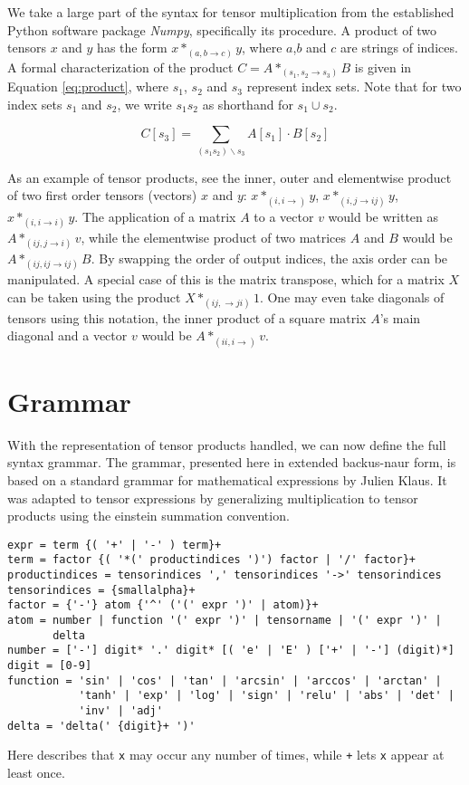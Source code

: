 \documentclass[12pt, a4paper]{report}
\begin{document}
We take a large part of the syntax for tensor multiplication from the established Python software package \textit{Numpy}, specifically its  procedure. %
A product of two tensors $x$ and $y$ has the form $x*_{(a,b \rightarrow c)}y$, where $a$,$b$ and $c$ are strings of indices.
A formal characterization of the product $C = A *_{(s_1,s_2 \rightarrow s_3)} B$ is given in Equation \ref{eq:product}, where $s_1$, $s_2$ and $s_3$ represent index sets.
Note that for two index sets $s_1$ and $s_2$, we write $s_1 s_2$ as shorthand for $s_1 \cup s_2$.

\begin{equation}
    C[s_3] = \sum_{(s_1 s_2)  \backslash s_3} A[s_1] \cdot B[s_2]
    \label{eq:product}
\end{equation}

As an example of tensor products, see the inner, outer and elementwise product of two first order tensors (vectors) $x$ and $y$: $x*_{(i,i \rightarrow)}y$, $x*_{(i,j \rightarrow ij)}y$, $x*_{(i,i \rightarrow i)}y$.
The application of a matrix $A$ to a vector $v$ would be written as $A*_{(ij,j \rightarrow i)}v$, while the elementwise product of two matrices $A$ and $B$ would be $A*_{(ij,ij \rightarrow ij)}B$.
By swapping the order of output indices, the axis order can be manipulated.
A special case of this is the matrix transpose, which for a matrix $X$ can be taken using the product $X *_{(ij, \rightarrow ji)} 1$.
One may even take diagonals of tensors using this notation, the inner product of a square matrix $A$'s main diagonal and a vector $v$ would be $A*_{(ii,i \rightarrow)}v$.


\section{Grammar}
With the representation of tensor products handled, we can now define the full syntax grammar.
The grammar, presented here in extended backus-naur form, is based on a standard grammar for mathematical expressions by Julien Klaus. %
It was adapted to tensor expressions by generalizing multiplication to tensor products using the einstein summation convention.
\begin{verbatim}
expr = term {( '+' | '-' ) term}+
term = factor {( '*(' productindices ')') factor | '/' factor}+
productindices = tensorindices ',' tensorindices '->' tensorindices
tensorindices = {smallalpha}+
factor = {'-'} atom {'^' ('(' expr ')' | atom)}+
atom = number | function '(' expr ')' | tensorname | '(' expr ')' | 
       delta
number = ['-'] digit* '.' digit* [( 'e' | 'E' ) ['+' | '-'] (digit)*]
digit = [0-9]
function = 'sin' | 'cos' | 'tan' | 'arcsin' | 'arccos' | 'arctan' | 
           'tanh' | 'exp' | 'log' | 'sign' | 'relu' | 'abs' | 'det' | 
           'inv' | 'adj'    
delta = 'delta(' {digit}+ ')' 
\end{verbatim}
Here \texttt{} describes that \texttt{x} may occur any number of times, while \texttt{+} lets \texttt{x} appear at least once.
\end{document}
